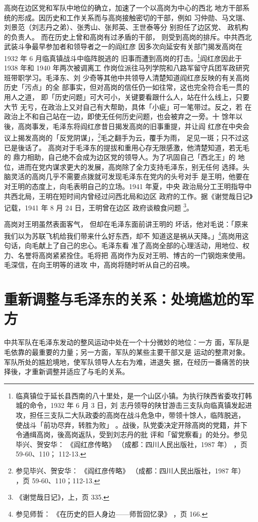 高岗在边区党和军队中地位的确立，加速了一个以高岗为中心的西北
地方干部系统的形成。因历史和工作关系而与高岗接触密切的干部，例如
习仲勋、马文瑞、刘景范（刘志丹之弟）、张秀山、张邦英、王世泰等分
别担任了边区党、
政机构的负责人。
而在历史上曾和高岗有过矛盾的干部，
则受到高岗的排斥。中共西北武装斗争最早参加者和领导者之一的阎红彦
因多次向延安有关部门揭发高岗在 1932 年 6 月临真镇战斗中临阵脱逃的
旧事而遭到高岗的打击。\footnote{临真镇位于延长县西南的八十里处，是一个山区小镇。为执行陕西省委攻打韩城的命令，1932 年 6 月 3 日，刘
志丹领导的陕甘游击三支队向临真镇发起进攻，担任三支队二大队政委的高岗在战斗危急中，带领十馀人，临阵脱逃，
使战斗「前功尽弃，转胜为败」
。战後，队党委决定开除高岗的党籍，并下令通缉高岗，後高岗返队，受到刘志丹的批
评和「留党察看」的处分。参见毕兴、贺安华：
《阎红彦传略》
（成都：四川人民出版社，1987 年）
，页 59-60、110；
112-13. }阎红彦因此于 1938 年和 1940 年两次被调离工
作岗位派往马列学院和八路军留守兵团军政研究班带职学习。毛泽东、刘
少奇等其他中共领导人清楚知道阎红彦反映的有关高岗历史「污点」的全
部事实，但对高岗的信任仍一如往常，这也完全符合毛一贯的用人之道，
即「历史问题」可大可小，关键要看跟什么人，站在什么线上，只要大节
无亏，在政治上又对自己有大帮助，具体「小疵」可一笔带过。反之，若
在政治上不和自己站在一边，即使无任何历史问题，也会被弃之一旁。十
馀年以後，高岗事发，毛泽东将阎红彦昔日揭发高岗的旧事重提，并让阎
红彦在中央会议上揭发高岗的「反党阴谋」，\footnote{参见毕兴、贺安华：
《阎红彦传略》
（成都：四川人民出版社，1987 年）
，页 59-60、110；112-13. 
}毛之翻手为云，覆手为雨，
足见一斑；只不过这已是後话了。
高岗对于毛泽东的提拔和重用心存无限感激，他清楚知道，若无毛的
鼎力相助，自己绝不会成为边区党的领导人。为了巩固自己「西北王」的
地位，进而在党内谋求更大的发展，高岗除了全力支持毛泽东，别无任何
选择。头脑灵活的高岗几乎不需要点拨就可发现毛泽东在党内的头号对手
是王明，他要在对王明的态度上，向毛表明自己的立场。1941 年夏，中央
政治局分工王明指导中共西北局，王明在短时间内曾经过问西北局和边区
政府的工作。据《谢觉哉日记》记载，1941 年 8 月 24 日，王明曾在边区
政府谈粮食问题
\footnote{《谢觉哉日记》，上，页 335. }。

高岗对王明虽然表面客气，
但却在毛泽东面前讲王明的
坏话，他对毛说：「原来我们以为苏联飞机给我们带来什么好东西，却不
知道这是祸从天降。」\footnote{参见师哲：
《在历史的巨人身边——师哲回忆录》
，页 166. }高岗用这句话，向毛献上了自己的忠心。毛泽东看
准了高岗全部的心理活动，用地位、权力、名誉将高岗紧紧拴住。毛将把
高岗作为反对王明、博古的一门钢炮来使用。毛深信，在向王明等的进攻
中，高岗将随时听从自己的召唤。

\section{重新调整与毛泽东的关系：处境尴尬的军方
}
中共军队在毛泽东发动的整风运动中处在一个十分微妙的地位：一方
面，军队是毛依靠的最重要的力量；另一方面，军队的某些主要干部又是
运动的整肃对象。军队所处的尴尬境地，使军队领导人左右为难，进退失
据，在经历一番痛苦的抉择後，才重新调整并适应了与毛的关系。

